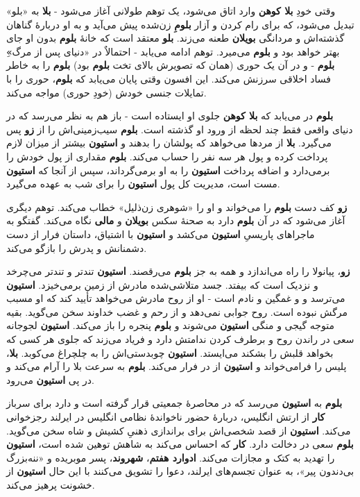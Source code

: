 \documentclass[12pt]{book}
\newcommand{\noun}[1]{{\textbf{#1}}}
\begin{document}
    وقتی خودِ \noun{بلا کوهن} وارد اتاق می‌شود، یک توهم طولانی آغاز می‌شود - \noun{بلا} به «بلو» تبدیل می‌شود، که برای رام کردن و آزار \noun{بلومِ} زن‌شده پیش می‌آید و به او دربارهٔ گناهان گذشته‌اش و مردانگی \noun{بویلان} طعنه می‌زند. \noun{بلو} معتقد است که خانهٔ \noun{بلوم} بدون او جای بهتر خواهد بود و \noun{بلوم} می‌میرد. توهم ادامه می‌یابد - احتمالاٌ در «دنیای پس از مرگ»ِ \noun{بلوم} - و در آن یک حوری (همان که تصویرش بالای تخت \noun{بلوم} بود) \noun{بلوم} را به خاطر فساد اخلاقی سرزنش می‌کند. این افسون وقتی پایان می‌یابد که \noun{بلوم}، حوری را با تمایلات جنسی خودش (خودِ حوری) مواجه می‌کند.

    \noun{بلوم} در می‌یابد که \noun{بلا کوهن} جلوی او ایستاده است - باز هم به نظر می‌رسد که در دنیای واقعی فقط چند لحظه از ورود او گذشته است. \noun{بلوم} سیب‌زمینی‌اش را از \noun{زو} پس می‌گیرد. \noun{بلا} از مردها می‌خواهد که پولشان را بدهند و \noun{استیون} بیشتر از میزان لازم پرداخت کرده و پول هر سه نفر را حساب می‌کند. \noun{بلوم} مقداری از پول خودش را برمی‌دارد و اضافه پرداخت \noun{استیون} را به او برمی‌گرداند، سپس از آنجا که \noun{استیون} مست است، مدیریت کل پول \noun{استیون} را برای شب به عهده می‌گیرد.

    \noun{زو} کف دست \noun{بلوم} را می‌خواند و او را «شوهری زن‌ذلیل» خطاب می‌کند. توهم دیگری آغاز می‌شود که در آن \noun{بلوم} دارد به صحنهٔ سکس \noun{بویلان} و \noun{مالی} نگاه می‌کند. گفتگو به ماجراهای پاریسیِ \noun{استیون} می‌کشد و \noun{استیون} با اشتیاق، داستان فرار از دست دشمنانش و پدرش را بازگو می‌کند.

    \noun{زو}، پیانولا را راه می‌اندازد و همه به جز \noun{بلوم} می‌رقصند. \noun{استیون} تندتر و تندتر می‌چرخد و نزدیک است که بیفتد. جسد متلاشی‌شده مادرش از زمین برمی‌خیزد. \noun{استیون} می‌ترسد و و غمگین و نادم است - او از روح مادرش می‌خواهد تأیید کند که او مسبب مرگش نبوده است. روح جوابی نمی‌دهد و از رحم و غضب خداوند سخن می‌گوید. بقیه متوجه گیجی و منگی \noun{استیون} می‌شوند و \noun{بلوم} پنجره را باز می‌کند. \noun{استیون} لجوجانه سعی در راندن روح و برطرف کردن ندامتش دارد و فریاد می‌زند که جلوی هر کسی که بخواهد قلبش را بشکند می‌ایستد. \noun{استیون} چوبدستی‌اش را به چلچراغ می‌کوبد. \noun{بلا}، پلیس را فرامی‌خواند و \noun{استیون} از در فرار می‌کند. \noun{بلوم} به سرعت بلا را آرام می‌کند و در پی \noun{استیون} می‌رود.

    \noun{بلوم} به \noun{استیون} می‌رسد که در محاصرهٔ جمعیتی قرار گرفته است و دارد برای سرباز \noun{کار} از ارتش انگلیس، دربارهٔ حضور ناخواندهٔ نظامی انگلیس در ایرلند رجزخوانی می‌کند. \noun{استیون} از قصد شخصی‌اش برای براندازی ذهنیِ کشیش و شاه سخن می‌گوید. \noun{بلوم} سعی در دخالت دارد. \noun{کار} که احساس می‌کند به شاهش توهین شده است، \noun{استیون} را تهدید به کتک و مجازات می‌کند. \noun{ادوارد هفتم}، \noun{شهروند‬}، پسر موبریده و «ننه‌بزرگ بی‌دندون پیر»، به عنوان تجسم‌های ایرلند، دعوا را تشویق می‌کنند با این حال \noun{استیون} از خشونت پرهیز می‌کند.
\end{document}
